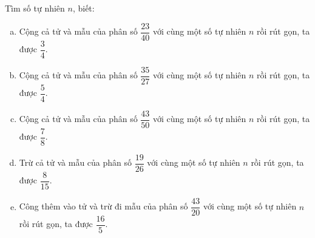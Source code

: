 \begin{bt}
\end{bt}   \begin{bt}
 Tìm số tự nhiên $n$, biết:
\begin{enumerate}[a)]
\item Cộng cả tử và mẫu của phân số $\dfrac{23}{40}$ với cùng một số tự nhiên $n$ rồi rút gọn, ta được $\dfrac{3}{4}$.
\item Cộng cả tử và mẫu của phân số $\dfrac{35}{27}$ với cùng một số tự nhiên $n$ rồi rút gọn, ta được $\dfrac{5}{4}$.
\item Cộng cả tử và mẫu của phân số $\dfrac{43}{50}$ với cùng một số tự nhiên $n$ rồi rút gọn, ta được $\dfrac{7}{8}$.
\item Trừ cả tử và mẫu của phân số $\dfrac{19}{26}$ với cùng một số tự nhiên $n$ rồi rút gọn, ta được $\dfrac{8}{15}$.
\item Công thêm vào tử và trừ đi mẫu của phân số $\dfrac{43}{20}$ với cùng một số tự nhiên $n$ rồi rút gọn, ta được $\dfrac{16}{5}$.
\end{enumerate}
\end{bt}